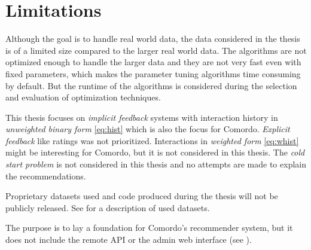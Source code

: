 
\section{Limitations}\label{sec:intro:limitations}

Although the goal is to handle real world data, the data considered in the thesis is of a limited size compared to the larger real world data. The algorithms are not optimized enough to handle the larger data and they are not very fast even with fixed parameters, which makes the parameter tuning algorithms time consuming by default. But the runtime of the algorithms is considered during the selection and evaluation of optimization techniques.

This thesis focuses on \textit{implicit feedback} systems with interaction history in \textit{unweighted binary form} \eqref{eq:hist} which is also the focus for Comordo. \textit{Explicit feedback} like ratings was not prioritized. Interactions in \textit{weighted form} \eqref{eq:whist} might be interesting for Comordo, but it is not considered in this thesis. The \textit{cold start problem} \citep{cacheda2011comparison} is not considered in this thesis and no attempts are made to explain the recommendations.

Proprietary datasets used and code produced during the thesis will not be publicly released. See  for a description of used datasets.

The purpose is to lay a foundation for Comordo's recommender system, but it does not include the remote API or the admin web interface (see ).

